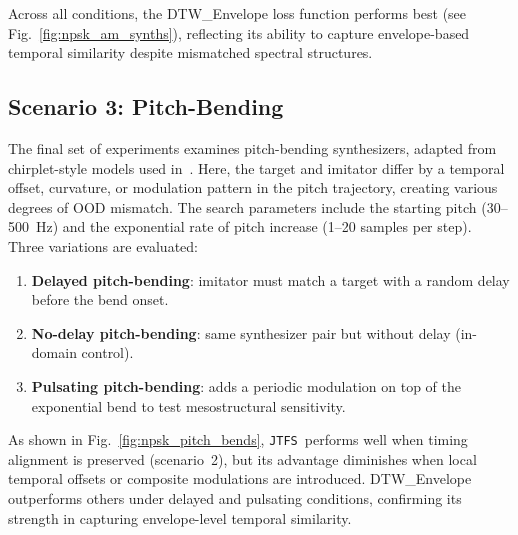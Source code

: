 \documentclass[runningheads]{llncs}
\newcommand{\JTFS}{\texttt{JTFS}\xspace}
\begin{document}
Across all conditions, the DTW\_Envelope loss function performs best (see Fig.~\ref{fig:npsk_am_synths}), reflecting its ability to capture envelope-based temporal similarity despite mismatched spectral structures.



\subsection{Scenario 3: Pitch-Bending}
The final set of experiments examines pitch-bending synthesizers, adapted from chirplet-style models used in~\cite{vahidi2023mesostructures}.  
Here, the target and imitator differ by a temporal offset, curvature, or modulation pattern in the pitch trajectory, creating various degrees of OOD mismatch.  
The search parameters include the starting pitch (30–500~Hz) and the exponential rate of pitch increase (1–20 samples per step).  
Three variations are evaluated:
\begin{enumerate}
  \item \textbf{Delayed pitch-bending}: imitator must match a target with a random delay before the bend onset.  
  \item \textbf{No-delay pitch-bending}: same synthesizer pair but without delay (in-domain control).  
  \item \textbf{Pulsating pitch-bending}: adds a periodic modulation on top of the exponential bend to test mesostructural sensitivity.
\end{enumerate}

As shown in Fig.~\ref{fig:npsk_pitch_bends}, \JTFS\ performs well when timing alignment is preserved (scenario~2), but its advantage diminishes when local temporal offsets or composite modulations are introduced.  
DTW\_Envelope outperforms others under delayed and pulsating conditions, confirming its strength in capturing envelope-level temporal similarity.






\end{document}
